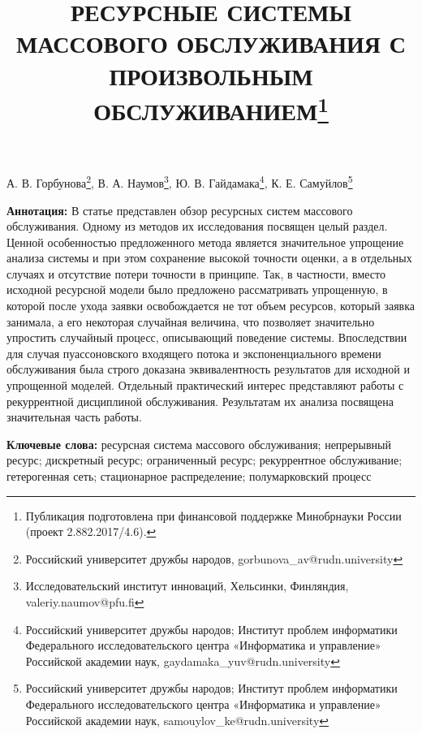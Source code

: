 \documentclass[a4paper,12pt]{article}
\begin{document}
\title{РЕСУРСНЫЕ СИСТЕМЫ МАССОВОГО ОБСЛУЖИВАНИЯ С ПРОИЗВОЛЬНЫМ ОБСЛУЖИВАНИЕМ\thanks{Публикация подготовлена при финансовой поддержке Минобрнауки России (проект 2.882.2017/4.6).}}

\date{}

\maketitle

\vspace{-2cm}

\begin{center}
А. В. Горбунова\footnote[1]{Российский университет дружбы народов, gorbunova\_av@rudn.university},
В. А. Наумов\footnote[2]{Исследовательский институт инноваций, Хельсинки, Финляндия, valeriy.naumov@pfu.fi},
Ю. В. Гайдамака\footnote[3]{Российский университет дружбы народов; Институт проблем информатики Федерального исследовательского центра «Информатика и управление» Российской академии наук, gaydamaka\_yuv@rudn.university},
К. Е. Самуйлов\footnote[4]{Российский университет дружбы народов; Институт проблем информатики Федерального исследовательского центра «Информатика и управление» Российской академии наук, samouylov\_ke@rudn.university}
\end{center}

\sloppy

\noindent
\textbf{Аннотация:}
В статье представлен обзор ресурсных систем массового обслуживания. Одному из методов их исследования посвящен целый раздел. Ценной особенностью предложенного метода является значительное упрощение анализа системы и при этом сохранение высокой точности оценки, а в отдельных случаях и отсутствие потери точности в принципе. Так, в частности, вместо исходной ресурсной модели было предложено рассматривать упрощенную, в которой после ухода заявки освобождается не тот объем ресурсов, который заявка занимала, а его некоторая случайная величина, что позволяет значительно упростить случайный процесс, описывающий поведение системы. Впоследствии для случая пуассоновского входящего потока и экспоненциального времени обслуживания была строго доказана эквивалентность результатов для исходной и упрощенной моделей. Отдельный практический интерес представляют работы с рекуррентной дисциплиной обслуживания. Результатам их анализа посвящена значительная часть работы.

\vspace{\baselineskip}     %

\noindent
\textbf{Ключевые слова:} ресурсная система массового обслуживания; непрерывный ресурс; дискретный ресурс; ограниченный ресурс; рекуррентное обслуживание; гетерогенная сеть; стационарное распределение; полумарковский процесс
\end{document}

